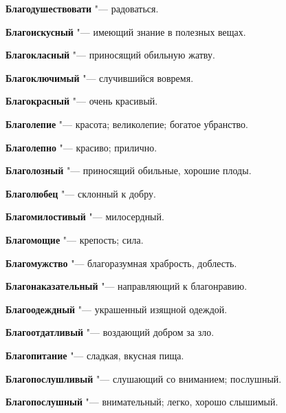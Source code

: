 \begin{mymulticols}{2}
\noindent\textbf{Благодушествовати} "--- радоваться. 




\noindent\textbf{Благоискусный} "--- имеющий знание в полезных вещах. 




\noindent\textbf{Благокласный} "--- приносящий обильную жатву. 




\noindent\textbf{Благоключимый} "--- случившийся вовремя. 




\noindent\textbf{Благокрасный} "--- очень красивый. 




\noindent\textbf{Благолепие} "--- красота; великолепие; богатое убранство. 




\noindent\textbf{Благолепно} "--- красиво; прилично. 




\noindent\textbf{Благолозный} "--- приносящий обильные, хорошие плоды. 




\noindent\textbf{Благолюбец} "--- склонный к добру. 




\noindent\textbf{Благомилостивый} "--- милосердный. 




\noindent\textbf{Благомощие} "--- крепость; сила. 




\noindent\textbf{Благомужство} "--- благоразумная храбрость, доблесть. 




\noindent\textbf{Благонаказательный} "--- направляющий к благонравию. 




\noindent\textbf{Благоодеждный} "--- украшенный изящной одеждой. 




\noindent\textbf{Благоотдатливый} "--- воздающий добром за зло. 




\noindent\textbf{Благопитание} "--- сладкая, вкусная пища. 




\noindent\textbf{Благопослушливый} "--- слушающий со вниманием; послушный. 




\noindent\textbf{Благопослушный} "--- внимательный; легко, хорошо слышимый. 





\end{mymulticols}
